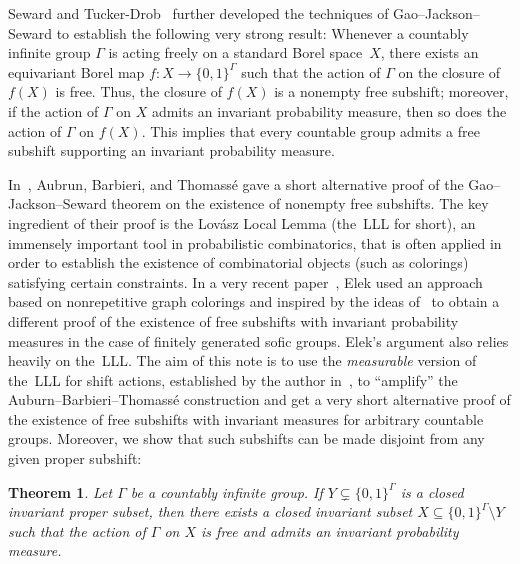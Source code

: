 \documentclass[12pt]{amsart}
\newtheorem{theo}{Theorem}[section]
\theoremstyle{definition}
\theoremstyle{remark}
\newcommand{\0}{\emptyset}
\newcommand{\set}[1]{\{#1\}}
\numberwithin{equation}{section}
\begin{document}
	Seward and Tucker-Drob~\cite{T-DS} further developed the techniques of Gao--Jackson--Seward to establish the following very strong result: Whenever a countably infinite group $\Gamma$ is acting freely on a standard Borel space~$X$, there exists an equivariant Borel map $f \colon X \to \set{0,1}^\Gamma$ such that the action of $\Gamma$ on the closure of $f(X)$ is free. Thus, the closure of $f(X)$ is a nonempty free subshift; moreover, if the action of $\Gamma$ on $X$ admits an invariant probability measure, then so does the action of $\Gamma$ on $f(X)$. This implies that every countable group admits a free subshift supporting an invariant probability measure. 
	
	In~\cite{ABT}, Aubrun, Barbieri, and Thomass\'e gave a short alternative proof of the Gao--Jackson--Seward theorem on the existence of nonempty free subshifts. The key ingredient of their proof is the Lov\'asz Local Lemma (the~LLL for short), an immensely important tool in probabilistic combinatorics, that is often applied in order to establish the existence of combinatorial objects (such as colorings) satisfying certain constraints. In a very recent paper~\cite{E}, Elek used an approach based on nonrepetitive graph colorings and inspired by the ideas of~\cite{AGHR} to obtain a different proof of the existence of free subshifts with invariant probability measures in the case of finitely generated sofic groups. Elek's argument also relies heavily on the~LLL. The aim of this note is to use the \emph{measurable} version of the~LLL for shift actions, established by the author in~\cite{B}, to ``amplify'' the Auburn--Barbieri--Thomass\'e construction and get a very short alternative proof of the existence of free subshifts with invariant measures for arbitrary countable groups. Moreover, we show that such subshifts can be made disjoint from any given proper subshift:
	
	\begin{theo}\label{theo:subshifts}
		Let $\Gamma$ be a countably infinite group. If $Y \subsetneq \set{0,1}^\Gamma$ is a closed invariant proper subset, then there exists a closed invariant subset $X \subseteq \set{0,1}^\Gamma \setminus Y$  such that the action of $\Gamma$ on $X$ is free and admits an invariant probability measure.
	\end{theo}
	
	
\end{document}
